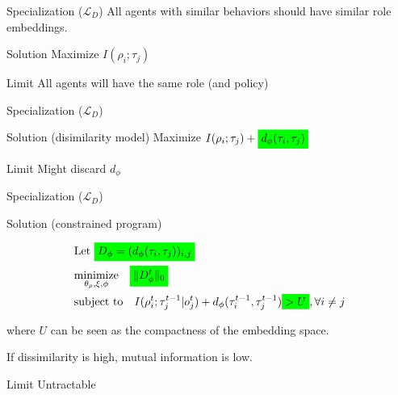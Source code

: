 \documentclass{beamer}
\newcommand{\mathcolorbox}[2]{\colorbox{#1}{$\displaystyle #2$}}
\begin{document}
    \begin{frame}{Specialization ($\mathcal{L}_{D}$)}
        All agents with similar behaviors should have similar role embeddings.
        \pause
        \begin{exampleblock}{Solution}
            Maximize $I(\rho_i;\tau_j)$
        \end{exampleblock}
            \pause
        \begin{alertblock}{Limit}
            All agents will have the same role (and policy)
        \end{alertblock}
        \end{frame}
        \begin{frame}{Specialization ($\mathcal{L}_{D}$)}
            \begin{exampleblock}{Solution (disimilarity model)}
                Maximize $I(\rho_i;\tau_j) + \mathcolorbox {green}{d_{\phi}(\tau_i,\tau_j)}$
            \end{exampleblock}
            \pause
            \begin{alertblock}{Limit}
                Might discard $d_{\phi}$
            \end{alertblock}
    \end{frame}
    \begin{frame}{Specialization ($\mathcal{L}_{D}$)}

        \begin{exampleblock}{Solution (constrained program)}

            \begin{align*}
                & \text{Let}\ \mathcolorbox{green}{D_\phi=(d_{\phi}(\tau_i,\tau_j))_{i,j}}\\
                &\underset{{\theta_\rho, \xi, \phi}}{\text{minimize}} \ \ \ \mathcolorbox {green}{\|D_\phi^t\|_{0}} \\
                &\text{subject to} \ \ \ I(\rho^{t}_i; \tau^{t-1}_j|o^t_j) + d_\phi(\tau^{t-1}_i, \tau^{t-1}_j) \mathcolorbox {green}{>U}, \forall i\ne j
            \end{align*}

%
        \end{exampleblock}

        where $U$ can be seen as the compactness of the embedding space.
        \pause
        \begin{block}{}
            If dissimilarity is high, mutual information is low.

        \end{block}
        \pause
        \begin{alertblock}{Limit}
            Untractable
        \end{alertblock}
    \end{frame}
\end{document}
